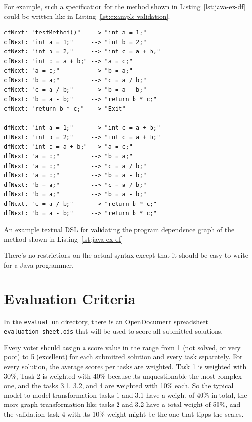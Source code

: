 \documentclass[11pt]{article}
\begin{document}
For example, such a specification for the method shown in
Listing~\ref{lst:java-ex-df} could be written like in
Listing~\ref{lst:example-validation}.

\begin{listing}
\begin{verbatim}
cfNext: "testMethod()"   --> "int a = 1;"
cfNext: "int a = 1;"     --> "int b = 2;"
cfNext: "int b = 2;"     --> "int c = a + b;"
cfNext: "int c = a + b;" --> "a = c;"
cfNext: "a = c;"         --> "b = a;"
cfNext: "b = a;"         --> "c = a / b;"
cfNext: "c = a / b;"     --> "b = a - b;"
cfNext: "b = a - b;"     --> "return b * c;"
cfNext: "return b * c;"  --> "Exit"

dfNext: "int a = 1;"     --> "int c = a + b;"
dfNext: "int b = 2;"     --> "int c = a + b;"
dfNext: "int c = a + b;" --> "a = c;"
dfNext: "a = c;"         --> "b = a;"
dfNext: "a = c;"         --> "c = a / b;"
dfNext: "a = c;"         --> "b = a - b;"
dfNext: "b = a;"         --> "c = a / b;"
dfNext: "b = a;"         --> "b = a - b;"
dfNext: "c = a / b;"     --> "return b * c;"
dfNext: "b = a - b;"     --> "return b * c;"
\end{verbatim}
  \caption{An example textual DSL for validating the program dependence graph
    of the method shown in Listing~\ref{lst:java-ex-df}}
  \label{lst:example-validation}
\end{listing}

There's no restrictions on the actual syntax except that it should be easy to
write for a Java programmer.


\section{Evaluation Criteria}
\label{sec:evaluation-criteria}

In the \verb|evaluation| directory, there is an OpenDocument spreadsheet
\verb|evaluation_sheet.ods| that will be used to score all submitted solutions.

Every voter should assign a score value in the range from 1 (not solved, or
very poor) to 5 (excellent) for each submitted solution and every task
separately.  For every solution, the average scores per tasks are weighted.
Task 1 is weighted with 30\%, Task 2 is weighted with 40\% because its
unquestionable the most complex one, and the tasks 3.1, 3.2, and 4 are weighted
with 10\% each.  So the typical model-to-model transformation tasks 1 and 3.1
have a weight of 40\% in total, the more graph transformation like tasks 2 and
3.2 have a total weight of 50\%, and the validation task 4 with its 10\% weight
might be the one that tipps the scales.
\end{document}
